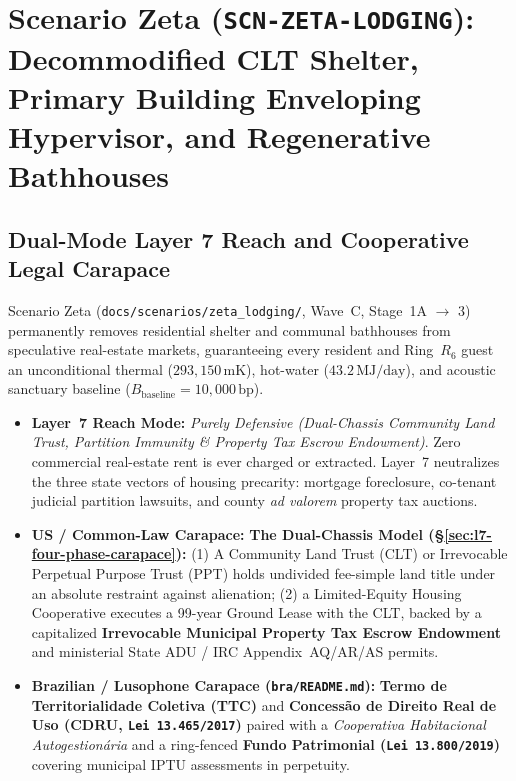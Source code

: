 \chapter{Scenario Zeta (\texttt{SCN-ZETA-LODGING}): Decommodified CLT Shelter, Primary Building Enveloping Hypervisor, and Regenerative Bathhouses}
\label{app:scenario-zeta}

\section{Dual-Mode Layer 7 Reach and Cooperative Legal Carapace}
Scenario Zeta (\texttt{docs/scenarios/zeta\_lodging/}, Wave~C, Stage~1A $\to$ 3) permanently removes residential shelter and communal bathhouses from speculative real-estate markets, guaranteeing every resident and Ring~$R_6$ guest an unconditional thermal ($293{,}150\,\mathrm{mK}$), hot-water ($43.2\,\mathrm{MJ/day}$), and acoustic sanctuary baseline ($B_{\mathrm{baseline}} = 10{,}000\,\mathrm{bp}$).
\begin{itemize}
    \item \textbf{Layer~7 Reach Mode:} \textit{Purely Defensive (Dual-Chassis Community Land Trust, Partition Immunity \& Property Tax Escrow Endowment)}. Zero commercial real-estate rent is ever charged or extracted. Layer~7 neutralizes the three state vectors of housing precarity: mortgage foreclosure, co-tenant judicial partition lawsuits, and county \textit{ad valorem} property tax auctions.
    \item \textbf{US / Common-Law Carapace:} \textbf{The Dual-Chassis Model (\S\ref{sec:l7-four-phase-carapace}):} (1) A Community Land Trust (CLT) or Irrevocable Perpetual Purpose Trust (PPT) holds undivided fee-simple land title under an absolute restraint against alienation; (2) a Limited-Equity Housing Cooperative executes a 99-year Ground Lease with the CLT, backed by a capitalized \textbf{Irrevocable Municipal Property Tax Escrow Endowment} and ministerial State ADU / IRC Appendix~AQ/AR/AS permits.
    \item \textbf{Brazilian / Lusophone Carapace (\texttt{bra/README.md}):} \textbf{Termo de Territorialidade Coletiva (TTC)} and \textbf{Concess{\~a}o de Direito Real de Uso (CDRU, \texttt{Lei 13.465/2017})} \parencite{brazil_ttc2017} paired with a \textit{Cooperativa Habitacional Autogestion{\'a}ria} and a ring-fenced \textbf{Fundo Patrimonial (\texttt{Lei 13.800/2019})} covering municipal IPTU assessments in perpetuity.
\end{itemize}

